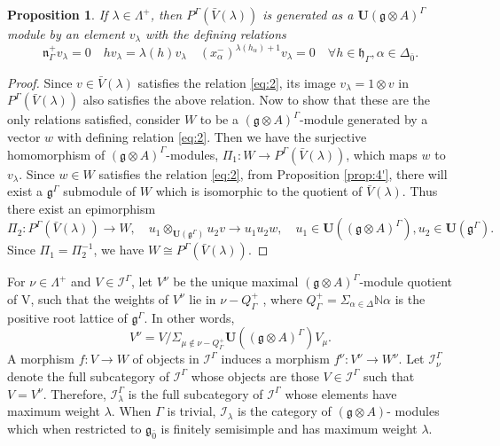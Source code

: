 \documentclass[11pt]{amsart}
\theoremstyle{plain}
\newtheorem{prop}[thm]{Proposition}
\theoremstyle{definition}
\newcommand{\g}{\mathfrak{g}}
\newcommand{\h}{\mathfrak{h}}
\newcommand{\n}{\mathfrak{n}}
\begin{document}
 \begin{prop}
If $\lambda\in \Lambda^+$, then $P^\Gamma(\bar{V}(\lambda))$ is generated as a $\mathbf{U}(\g\otimes A)^\Gamma$ module by an element $v_\lambda$ with the defining relations
\begin{equation}\label{eq:2}
         \n^+_{\Gamma}v_\lambda=0 \quad hv_\lambda=\lambda(h)v_\lambda \quad (x_{\alpha}^{-})^{\lambda(h_\alpha)+1}v_\lambda=0 \quad \forall h\in \h_{\Gamma}, \alpha \in \Delta_{\bar{0}}.
\end{equation}
\end{prop}
 \begin{proof}
Since $v\in \bar{V}(\lambda)$ satisfies the relation \eqref{eq:2}, its image $v_\lambda=1\otimes v$ in $P^\Gamma(\bar{V}(\lambda))$ also satisfies the above relation. Now to show that these are the only relations satisfied, consider $W$ to be a $(\g\otimes A)^\Gamma$-module generated by a vector $w$ with defining relation \eqref{eq:2}. Then we have the surjective homomorphism of $(\g\otimes A)^\Gamma$-modules, $\Pi_1:W\longrightarrow P^\Gamma(\bar{V}(\lambda))$, which maps $w$ to $v_\lambda$. Since $w\in W$ satisfies the relation \eqref{eq:2}, from Proposition \ref{prop:4'}, there will exist a $\g^\Gamma$ submodule of $W$ which is isomorphic to the quotient of $\bar{V}(\lambda)$. Thus there exist an epimorphism
\begin{equation*}
         \Pi_2:P^\Gamma(\bar{V}(\lambda))\longrightarrow W, \quad u_1\otimes_{\mathbf{U}(\g^{\Gamma})}u_2v\longrightarrow u_{1}u_{2}w, \quad u_1\in \mathbf{U}((\g\otimes A)^\Gamma), u_2\in \mathbf{U}(\g^\Gamma).
\end{equation*}
Since $\Pi_1=\Pi_{2}^{-1}$, we have $W\cong P^\Gamma(\bar{V}(\lambda))$.
 \end{proof}
 For $\nu\in \Lambda^+$ and $V\in\mathcal{I}^\Gamma$, let $V^\nu$ be the unique maximal $(\g\otimes A)^\Gamma$-module quotient of V, such that the weights of $V^\nu$ lie in $\nu-Q^+_{\Gamma}$ \label{pg:6}, where $Q^+_{\Gamma}=\Sigma_{\alpha\in \Delta}\mathbb{N}\alpha$ is the positive root lattice of $\g^{\Gamma}$. In other words,
 \begin{equation*}
     V^\nu=V/\Sigma_{\mu\notin\nu-Q^+_{\Gamma}}\mathbf{U}((\g\otimes A)^\Gamma)V_\mu.
\end{equation*}
A morphism $f:V\longrightarrow W$ of objects in $\mathcal{I}^\Gamma$ induces a morphism $f^\nu:V^\nu\longrightarrow W^\nu$. Let $\mathcal{I}^{\Gamma}_{\nu}$ denote the full subcategory of $\mathcal{I}^\Gamma$ whose objects are those $V\in\mathcal{I}^\Gamma$ such that $V=V^\nu$. Therefore, $\mathcal{I}_{\lambda}^{\Gamma}$ \label{pg:5} is the full subcategory of $\mathcal{I}^{\Gamma}$ whose elements have maximum weight $\lambda$. When $\Gamma$ is trivial, $\mathcal{I}_{\lambda}$ is the category of $(\g\otimes A)$- modules which when restricted to $\g_{\bar{0}}$ is finitely semisimple and has maximum weight $\lambda$.
\end{document}
